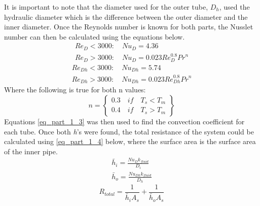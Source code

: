 %
It is important to note that the diameter used for the outer tube, ${ D }_{ h }$, used the hydraulic diameter which is the difference between the outer diameter and the inner diameter. Once the Reynolds number is known for both parts, the Nusslet number can then be calculated using the equations below. 
%
\begin{subequations}
\label{eq_part_1_5}
\begin{eqnarray}
 { R }e_{ D }<3000:\quad { Nu }_{ D }=4.36 \\
 { R }e_{ D }>3000:\quad { Nu }_{ D }=0.023{ Re }_{ D }^{ 0.8 }{ Pr }^{ n } 
\end{eqnarray}
\end{subequations}
\begin{subequations}
\label{eq_part_1_6}
\begin{eqnarray}
 { R }e_{ Dh }<3000:\quad { Nu }_{ Dh }=5.74 \\
 { R }e_{ Dh }>3000:\quad { Nu }_{ Dh }=0.023{ Re }_{ Dh }^{ 0.8 }{ Pr }^{ n } 
\end{eqnarray}
\end{subequations}
%
Where the following is true for both n values:
%
\begin{equation}
 n=\left\{ \begin{matrix} 0.3\quad if\quad { T }_{ s }<{ T }_{ m } \\ 0.4\quad if\quad { T }_{ s }>{ T }_{ m } \end{matrix} \right\} 
\end{equation}
%
%
Equations \eqref{eq_part_1_3} was then used to find the convection coefficient for each tube. Once both \textit{h}'s were found, the total resistance of the system could be calculated using \eqref{eq_part_1_4} below, where the surface area is the surface area of the inner pipe.
\begin{subequations}
\label{eq_part_1_3}
\begin{eqnarray}
 { \bar { h }  }_{ i }=\frac { { Nu }_{ D }{ k }_{ fluid } }{ { D }_{ i } }  \\
 { \bar { h }  }_{ o }=\frac { { Nu }_{ Dh }{ k }_{ fluid } }{ { D }_{ h } }  
\end{eqnarray}
\end{subequations}
%
\begin{equation}
 \label{eq_part_1_4}
 { R }_{ total }=\frac { 1 }{ { \bar { h }  }_{ i }{ A }_{ s } } +\frac { 1 }{ { \bar { h }  }_{ o }{ A }_{ s } } 
\end{equation}
